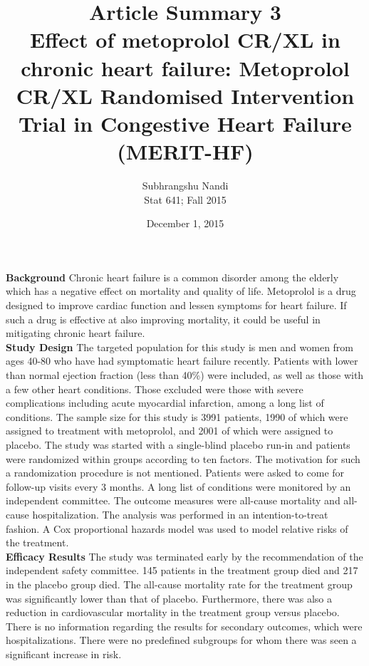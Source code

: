 \documentclass[11pt,a4paper]{article}
\begin{document}
\title{Article Summary 3 \\ Effect of metoprolol CR/XL in chronic heart failure: Metoprolol
CR/XL Randomised Intervention Trial in Congestive Heart Failure
(MERIT-HF)
}
\author{Subhrangshu Nandi\\
  Stat 641; Fall 2015}
\date{December 1, 2015}

\maketitle

\textbf{Background}
Chronic heart failure is a common disorder among the elderly which has a negative effect on mortality and quality of life. Metoprolol is a drug designed to improve cardiac function and lessen symptoms for heart failure. If such a drug is effective at also improving mortality, it could be useful in mitigating chronic heart failure. \\

\textbf{Study Design}
The targeted population for this study is men and women from ages 40-80 who have had symptomatic heart failure recently. Patients with lower than normal ejection fraction (less than 40\%) were included, as well as those with a few other heart conditions. Those excluded were those with severe complications including acute myocardial infarction, among a long list of conditions. The sample size for this study is 3991 patients, 1990 of which were assigned to treatment with metoprolol, and 2001 of which were assigned to placebo. The study was started with a single-blind placebo run-in and patients were randomized within groups according to ten factors. The motivation for such a randomization procedure is not mentioned. Patients were asked to come for follow-up visits every 3 months. A long list of conditions were monitored by an independent committee. The outcome measures were all-cause mortality and all-cause hospitalization. The analysis was performed in an intention-to-treat fashion. A Cox proportional hazards model was used to model relative risks of the treatment. \\

\textbf{Efficacy Results}
The study was terminated early by the recommendation of the independent safety committee. 145 patients in the treatment group died and 217 in the placebo group died. The all-cause mortality rate for the treatment group was significantly lower than that of placebo. Furthermore, there was also a reduction in cardiovascular mortality in the treatment group versus placebo. There is no information regarding the results for secondary outcomes, which were hospitalizations. There were no predefined subgroups for whom there was seen a significant increase in risk. 
 
\end{document}
